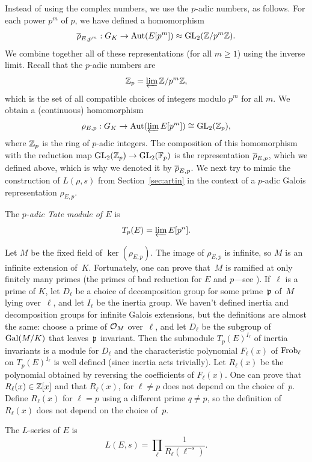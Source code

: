 Instead of using the complex numbers, we use the $p$-adic numbers, as
follows.  For each power $p^m$ of $p$, we have defined a homomorphism
$$
  \overline{\rho}_{E,p^m}: G_K \to \operatorname{Aut}(E[p^m]) \approx \operatorname{GL}_2(\mathbb{Z}/p^m\mathbb{Z}).
$$
We combine together all of these representations (for all $m\geq 1$)
using the inverse limit.
Recall that the $p$-adic numbers are
$$
  \mathbb{Z}_p = \varprojlim \mathbb{Z}/p^m\mathbb{Z},
$$
which is the set of all compatible choices of integers modulo $p^m$ for
all $m$.
We obtain a (continuous) homomorphism
$$
  \rho_{E,p}: G_K \to \operatorname{Aut}(\varprojlim E[p^m]) \cong \operatorname{GL}_2(\mathbb{Z}_p),
$$
where $\mathbb{Z}_p$ is the ring of $p$-adic integers.  The composition of
this homomorphism with the reduction map $\operatorname{GL}_2(\mathbb{Z}_p) \to \operatorname{GL}_2(\mathbb{F}_p)$
is the representation $\overline{\rho}_{E,p}$, which we defined above, which
is why we denoted it by $\overline{\rho}_{E,p}$. We
next try to mimic the construction of $L(\rho,s)$ from
Section~\ref{sec:artin} in the context of a $p$-adic Galois
representation $\rho_{E,p}$.

\begin{definition}
The \emph{$p$-adic Tate module of $E$} is
$$
  T_p(E) = \varprojlim E[p^n].
$$
\end{definition}

Let $M$ be the fixed field of $\ker(\rho_{E,p})$. The image of
$\rho_{E,p}$ is infinite, so $M$ is an infinite extension of~$K$.
Fortunately, one can prove that~$M$ is ramified at only finitely many
primes (the primes of bad reduction for $E$ and $p$---see \cite{serre-tate}).  If~$\ell$ is a
prime of $K$, let $D_{\ell}$ be a choice of decomposition group for
some prime~$\mathfrak{p}$ of~$M$ lying over~$\ell$, and let $I_{\ell}$ be the
inertia group.  We haven't defined inertia and decomposition groups
for infinite Galois extensions, but the definitions are almost the
same: choose a prime of $\mathcal{O}_M$ over~$\ell$, and let $D_{\ell}$ be the
subgroup of $\operatorname{Gal}(M/K)$ that leaves~$\mathfrak{p}$ invariant.  Then the
submodule $T_p(E)^{I_{\ell}}$ of inertia invariants is a module for
$D_{\ell}$ and the characteristic polynomial $F_{\ell}(x)$ of
$\operatorname{Frob}_{\ell}$ on $T_p(E)^{I_{\ell}}$ is well defined (since inertia
acts trivially).  Let $R_{\ell}(x)$ be the polynomial obtained by
reversing the coefficients of $F_{\ell}(x)$.  One can prove that
$R_{\ell}(x) \in \mathbb{Z}[x]$ and that $R_{\ell}(x)$, for $\ell\neq p$ does
not depend on the choice of~$p$.  Define $R_{\ell}(x)$ for $\ell=p$
using a different prime $q\neq p$, so the definition of $R_{\ell}(x)$
does not depend on the choice of~$p$.
\begin{definition}
The $L$-series of $E$ is
$$
 L(E,s) = \prod_{\ell} \frac{1}{R_\ell(\ell^{-s})}.
$$
\end{definition}

